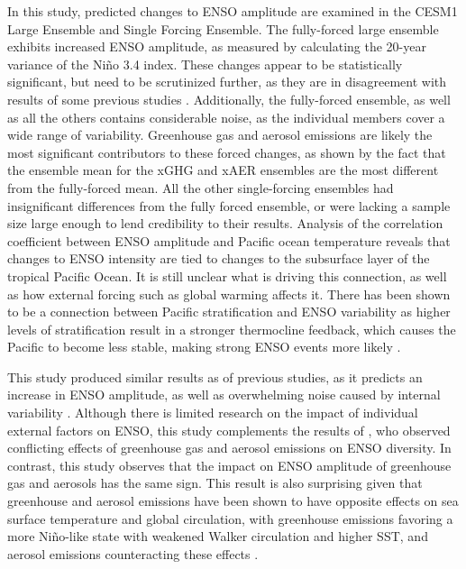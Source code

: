 \documentclass[11pt]{article}
\begin{document}
In this study, predicted changes to ENSO amplitude are examined in the CESM1 Large Ensemble and Single Forcing Ensemble. The fully-forced large ensemble exhibits increased ENSO amplitude, as measured by calculating the 20-year variance of the Niño 3.4 index. These changes appear to be statistically significant, but need to be scrutinized further, as they are in disagreement with results of some previous studies \citep{stevenson2012significant}. Additionally, the fully-forced ensemble, as well as all the others contains considerable noise, as the individual members cover a wide range of variability. Greenhouse gas and aerosol emissions are likely the most significant contributors to these forced changes, as shown by the fact that the ensemble mean for the xGHG and xAER ensembles are the most different from the fully-forced mean. All the other single-forcing ensembles had insignificant differences from the fully forced ensemble, or were lacking a sample size large enough to lend credibility to their results. Analysis of the correlation coefficient between ENSO amplitude and Pacific ocean temperature reveals that changes to ENSO intensity are tied to changes to the subsurface layer of the tropical Pacific Ocean. It is still unclear what is driving this connection, as well as how external forcing such as global warming affects it. There has been shown to be a connection between Pacific stratification and ENSO variability as higher levels of stratification result in a stronger thermocline feedback, which causes the Pacific to become less stable, making strong ENSO events more likely \citep{dewitte2012reinterpreting}.

This study produced similar results as of previous studies, as it predicts an increase in ENSO amplitude, as well as overwhelming noise caused by internal variability \citep{maher2018enso}. Although there is limited research on the impact of individual external factors on ENSO, this study complements the results of \citet{stevenson2017forced}, who observed conflicting effects of greenhouse gas and aerosol emissions on ENSO diversity. In contrast, this study observes that the impact on ENSO amplitude of greenhouse gas and aerosols has the same sign. This result is also surprising given that greenhouse and aerosol emissions have been shown to have opposite effects on sea surface temperature and global circulation, with greenhouse emissions favoring a more Niño-like state with weakened Walker circulation and higher SST, and aerosol emissions counteracting these effects \citep{boer2000transient}.
\end{document}
